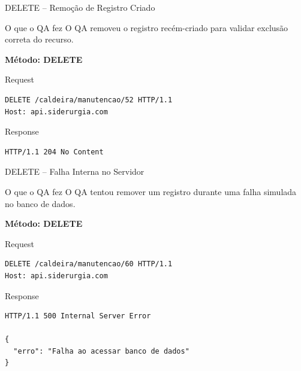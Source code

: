 \documentclass[9pt]{beamer}
\begin{document}
\begin{frame}[fragile]{DELETE – Remoção de Registro Criado}

\begin{block}{O que o QA fez}
O QA removeu o registro recém-criado
para validar exclusão correta do recurso.
\end{block}

\textbf{Método: DELETE}

\begin{block}{Request}
\begin{verbatim}
DELETE /caldeira/manutencao/52 HTTP/1.1
Host: api.siderurgia.com
\end{verbatim}
\end{block}

\begin{block}{Response}
\begin{verbatim}
HTTP/1.1 204 No Content
\end{verbatim}
\end{block}

\end{frame}
\begin{frame}[fragile]{DELETE – Falha Interna no Servidor}

\begin{block}{O que o QA fez}
O QA tentou remover um registro durante
uma falha simulada no banco de dados.
\end{block}

\textbf{Método: DELETE}

\begin{block}{Request}
\begin{verbatim}
DELETE /caldeira/manutencao/60 HTTP/1.1
Host: api.siderurgia.com
\end{verbatim}
\end{block}

\begin{block}{Response}
\begin{verbatim}
HTTP/1.1 500 Internal Server Error

{
  "erro": "Falha ao acessar banco de dados"
}
\end{verbatim}
\end{block}

\end{frame}
\end{document}
